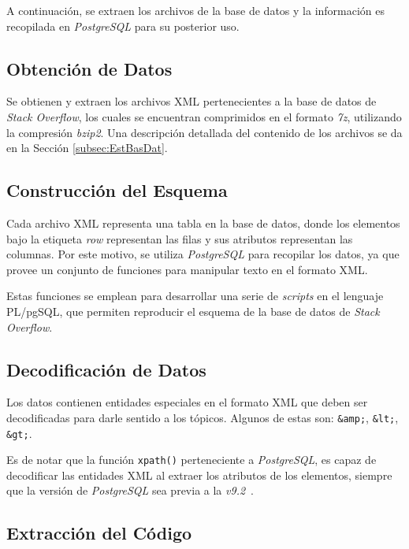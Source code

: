 A continuación, se extraen los archivos de la base de datos y
la información es recopilada en \textit{PostgreSQL} para su posterior uso.

\subsection{Obtención de Datos}

Se obtienen y extraen los archivos \ac{XML} pertenecientes
a la base de datos de \textit{Stack Overflow},
los cuales se encuentran comprimidos en el formato \textit{7z},
utilizando la compresión \textit{bzip2}.
Una descripción detallada del contenido de los archivos 
se da en la Sección \ref{subsec:EstBasDat}.

\subsection{Construcción del Esquema}

Cada archivo \ac{XML} representa una tabla en la base de datos, 
donde los elementos bajo la etiqueta \textit{row} representan 
las filas y sus atributos representan las columnas.
Por este motivo, se utiliza \textit{PostgreSQL} para recopilar los datos,
ya que provee un conjunto de funciones para manipular texto en el formato \ac{XML}.

Estas funciones se emplean para desarrollar una serie de \textit{scripts}
en el lenguaje \ac{PL/pgSQL}, que permiten reproducir el esquema de
la base de datos de \textit{Stack Overflow}.

\subsection{Decodificación de Datos}

Los datos contienen entidades especiales en el formato \ac{XML}
que deben ser decodificadas para darle sentido a los tópicos.
Algunos de estas son: \lstinline{&amp;}, \lstinline{&lt;}, \lstinline{&gt;}.

Es de notar que la función \lstinline{xpath()} perteneciente a \textit{PostgreSQL},
es capaz de decodificar las entidades \ac{XML} al extraer los atributos de los elementos,
siempre que la versión de \textit{PostgreSQL} sea previa a la \textit{v9.2}~\cite{CAAY5AM3Cj}.

\subsection{Extracción del Código}

